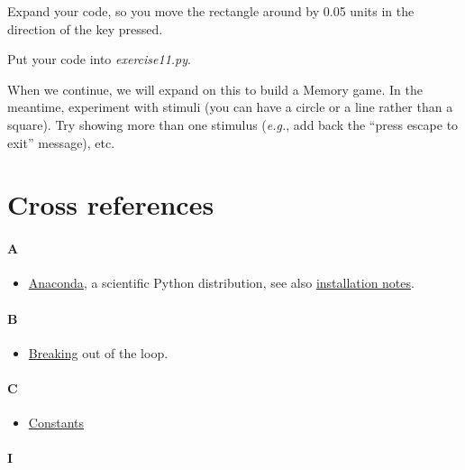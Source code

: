 \documentclass[
]{book}
\providecommand{\tightlist}{%
  \setlength{\itemsep}{0pt}\setlength{\parskip}{0pt}}
\begin{document}
Expand your code, so you move the rectangle around by 0.05 units in the direction of the key pressed.

Put your code into \emph{exercise11.py}.

When we continue, we will expand on this to build a Memory game. In the meantime, experiment with stimuli (you can have a circle or a line rather than a square). Try showing more than one stimulus (\emph{e.g.}, add back the ``press escape to exit'' message), etc.

\hypertarget{cross-references}{%
\chapter*{Cross references}\label{cross-references}}

\hypertarget{a}{%
\subsubsection*{A}\label{a}}

\begin{itemize}
\tightlist
\item
  \href{https://www.anaconda.com}{Anaconda}, a scientific Python distribution, see also \protect\hyperlink{install-anaconda}{installation notes}.
\end{itemize}

\hypertarget{b}{%
\subsubsection*{B}\label{b}}

\begin{itemize}
\tightlist
\item
  \protect\hyperlink{break}{Breaking} out of the loop.
\end{itemize}

\hypertarget{c}{%
\subsubsection*{C}\label{c}}

\begin{itemize}
\tightlist
\item
  \protect\hyperlink{constants}{Constants}
\end{itemize}

\hypertarget{i}{%
\subsubsection*{I}\label{i}}
\end{document}
